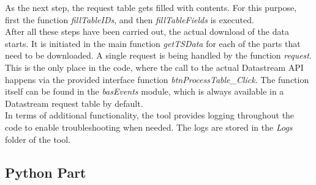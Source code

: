 As the next step, the request table gets filled with contents. For this purpose, first the function \textit{fillTableIDs}, and then \textit{fillTableFields} is executed. \\

After all these steps have been carried out, the actual download of the data starts. It is initiated in the main function \textit{getTSData} for each of the parts that need to be downloaded. A single request is being handled by the function \textit{request}. This is the only place in the code, where the call to the actual Datastream API happens via the provided interface function \textit{btnProcessTable\_Click}. The function itself can be found in the \textit{basEvents} module, which is always available in a Datastream request table by default. \\

In terms of additional functionality, the tool provides logging throughout the code to enable troubleshooting when needed. The logs are stored in the \textit{Logs} folder of the tool. 

\subsection{Python Part}


%






